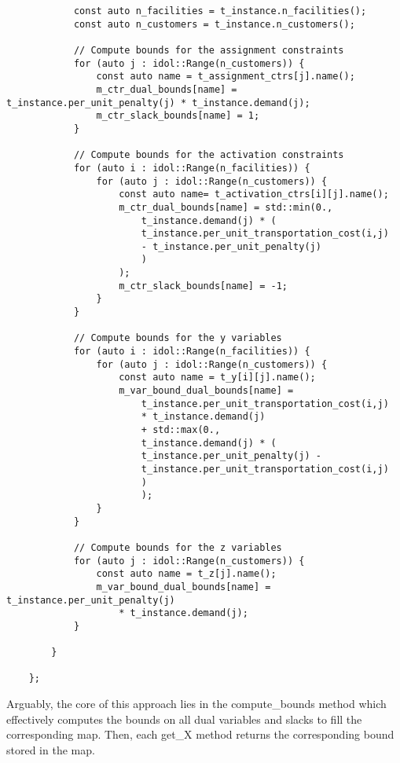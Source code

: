 \begin{lstlisting}
            const auto n_facilities = t_instance.n_facilities();
            const auto n_customers = t_instance.n_customers();

            // Compute bounds for the assignment constraints
            for (auto j : idol::Range(n_customers)) {
                const auto name = t_assignment_ctrs[j].name();
                m_ctr_dual_bounds[name] = t_instance.per_unit_penalty(j) * t_instance.demand(j);
                m_ctr_slack_bounds[name] = 1;
            }

            // Compute bounds for the activation constraints
            for (auto i : idol::Range(n_facilities)) {
                for (auto j : idol::Range(n_customers)) {
                    const auto name= t_activation_ctrs[i][j].name();
                    m_ctr_dual_bounds[name] = std::min(0.,
                        t_instance.demand(j) * (
                        t_instance.per_unit_transportation_cost(i,j) 
                        - t_instance.per_unit_penalty(j) 
                        )
                    );
                    m_ctr_slack_bounds[name] = -1;
                }
            }

            // Compute bounds for the y variables
            for (auto i : idol::Range(n_facilities)) {
                for (auto j : idol::Range(n_customers)) {
                    const auto name = t_y[i][j].name();
                    m_var_bound_dual_bounds[name] =
                        t_instance.per_unit_transportation_cost(i,j)
                        * t_instance.demand(j)
                        + std::max(0.,
                        t_instance.demand(j) * (
                        t_instance.per_unit_penalty(j) -
                        t_instance.per_unit_transportation_cost(i,j)
                        )
                        );
                }
            }

            // Compute bounds for the z variables
            for (auto j : idol::Range(n_customers)) {
                const auto name = t_z[j].name();
                m_var_bound_dual_bounds[name] = t_instance.per_unit_penalty(j) 
                    * t_instance.demand(j);
            }

        }

    };
\end{lstlisting}
Arguably, the core of this approach lies in the \textsf{compute\_bounds}
method which effectively computes the bounds on all dual variables and slacks
to fill the corresponding map. Then, each \textsf{get\_X} method returns the
corresponding bound stored in the map. 

